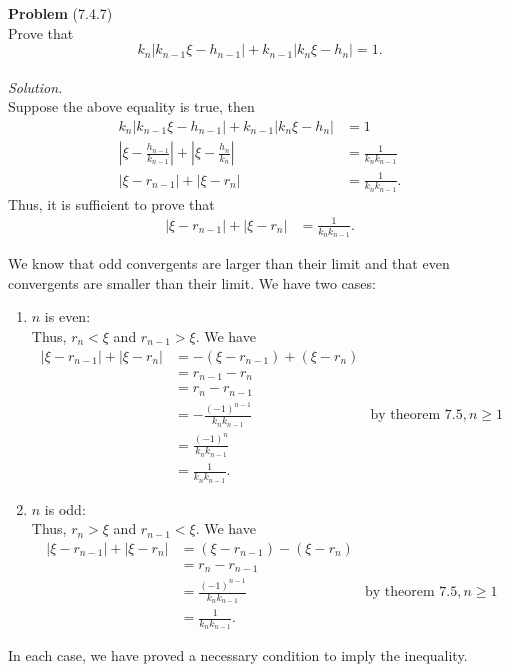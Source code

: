 \documentclass[12 pt]{amsart}
\begin{document}
\vfill
\newpage



\phantom{\quad} \vfill
\noindent
\textbf{Problem} (7.4.7) \\[4ex]
  Prove that 
  \[
    k_n | k_{n-1} \xi - h_{n-1} |
    + k_{n-1} |k_n \xi - h_n |
    = 1.
  \]
  \\[2ex]
\emph{Solution.} \\[2ex]
  Suppose the above equality is true, then
  \begin{align*}
    k_n | k_{n-1} \xi - h_{n-1} |+ k_{n-1} |k_n \xi - h_n | &= 1 \\
    \left| \xi - \frac{h_{n-1}}{k_{n-1}} \right| 
    + \left| \xi - \frac{h_{n}}{k_{n}} \right| 
    &= 
      \frac{1}{k_n k_{n-1}} \\
    \left| \xi - r_{n-1} \right| 
    + \left| \xi - r_n \right| 
    &= 
      \frac{1}{k_n k_{n-1}}.
  \end{align*}
  Thus, it is sufficient to prove that 
  \begin{align*}
    \left| \xi - r_{n-1} \right| 
    + \left| \xi - r_n \right| 
    &= 
      \frac{1}{k_n k_{n-1}}.
  \end{align*}

  We know that odd convergents are larger than their limit
  and that even convergents are smaller than their limit.
  We have two cases:
  \begin{enumerate}[(1)]
    \item $n$ is even: \\
      Thus, $r_n < \xi$ and $r_{n-1} > \xi$.
      We have
      \begin{align*}
        \left| \xi - r_{n-1} \right| 
        + \left| \xi - r_n \right| 
        &=
          -(\xi - r_{n-1}) + (\xi - r_n) \\
        &=
           r_{n-1} - r_n \\
        &=
           r_n - r_{n-1} \\
        &=
           - \frac{(-1)^{n-1}}{k_n k_{n-1}} 
           & \text{by theorem 7.5}, n \geq 1 \\
        &= 
           \frac{(-1)^{n}}{k_n k_{n-1}} \\
        &= 
           \frac{1}{k_n k_{n-1}}.
      \end{align*}
    \item $n$ is odd: \\
      Thus, $r_n > \xi$ and $r_{n-1} < \xi$.
      We have
      \begin{align*}
        \left| \xi - r_{n-1} \right| 
        + \left| \xi - r_n \right| 
        &=
          (\xi - r_{n-1}) - (\xi - r_n) \\
        &=
           r_n - r_{n-1} \\
        &=
           \frac{(-1)^{n-1}}{k_n k_{n-1}} 
           & \text{by theorem 7.5}, n \geq 1\\
        &= 
           \frac{1}{k_n k_{n-1}}.
      \end{align*}
  \end{enumerate}
  In each case, we have proved a necessary condition to 
  imply the inequality. 
\end{document}
